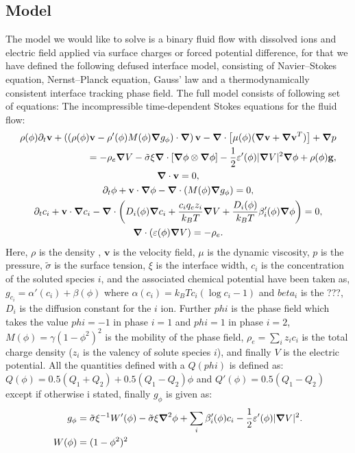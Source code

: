 \documentclass[a4paper,10pt]{article}
\renewcommand{\v}[1]{\mathbf{#1}}
\renewcommand{\v}[1]{\ensuremath{\mathbf{#1}}} %
\newcommand{\gv}[1]{\ensuremath{\mbox{\boldmath$ #1 $}}}
\newcommand{\grad}[1]{\gv{\nabla} #1} %
\renewcommand{\div}[1]{\gv{\nabla} \cdot #1} %
\newcommand{\laplacian}[1]{\grad^2 #1}
\newcommand{\pdt}[1]{\partial_t #1}
\begin{document}
\subsection*{Model}
The model we would like to solve is a binary fluid flow with dissolved ions and electric field applied via surface charges or forced potential difference, for that we have defined the following defused interface model, consisting of Navier--Stokes equation, Nernst--Planck equation, Gauss' law and a thermodynamically consistent interface tracking phase field.  
The full model consists of following set of equations:
The incompressible time-dependent Stokes equations for the fluid flow:
\begin{gather}
  \begin{split}
  \rho(\phi) \pdt \v v + \left( \left(\rho(\phi) \v v - \rho'(\phi) M(\phi) \grad g_\phi  \right) \cdot \grad \right) \v v - \div \left[  \mu(\phi)(\grad \v v + \grad \v v ^T) \right] + \grad p \\
  = - \rho_e \grad V - \tilde \sigma \xi\div \left[ \grad \phi \otimes \grad \phi \right] - \frac 1 2 \varepsilon'(\phi) | \grad V |^2 \grad \phi + \rho(\phi) \v g,
  \end{split}\\
  \div \v v = 0, \\
  \pdt \phi + \v v \cdot \grad \phi - \div(M(\phi) \grad g_\phi ) = 0, \\
  \pdt c_i + \v v \cdot \grad c_i - \div \left( D_{i} (\phi) \grad c_i + \frac{c_i q_e  z_i}{k_B T} \grad V +\frac{D_i(\phi)}{k_B T}\beta_i'(\phi) \grad \phi \right) = 0, \\
  \div ( \varepsilon (\phi) \grad V ) = - \rho_e.
\end{gather}
Here, $\rho$ is the density , $\v v$ is the velocity field, $\mu$ is the dynamic viscosity, $p$ is the pressure, $\tilde{\sigma}$ is the surface tension, $\xi$ is the interface width, $c_i$ is the concentration of the soluted species $i$, and the associated chemical potential have been taken as, $g_{c_i} = \alpha'(c_i)+\beta(\phi)$ where $\alpha(c_i) = k_B T c_i(\log c_i -1)$ and $beta_i$ is the ???, $D_i$ is the diffusion constant for the $i$ ion. Further $phi$ is the phase field which takes the value $phi = -1$ in phase $i=1$ and $phi = 1$ in phase $i=2$, $M(\phi)= \gamma (1 - \phi^2)^2$ is the mobility of the phase field, $\rho_e = \sum_i z_i c_i$ is the total charge density ($z_i$ is the valency of solute species $i$), and finally $V$ is the electric potential. All the quantities defined with a $Q(phi)$ is defined as: $Q(\phi) = 0.5(Q_1+Q_2)+0.5(Q_1-Q_2)\phi$ and $Q'(\phi) = 0.5(Q_1-Q_2)$ except if otherwise i stated, finally $g_{\phi}$ is given as:
\begin{align}
 g_\phi &= \tilde\sigma\xi^{-1}W'(\phi) - \tilde\sigma\xi\laplacian\phi + \sum_i \beta_i'(\phi) c_i - \frac 1 2 \varepsilon'(\phi) | \grad V |^2 .\\
 W(\phi) &= (1 - \phi^2)^2
\end{align} 
 
\end{document}

